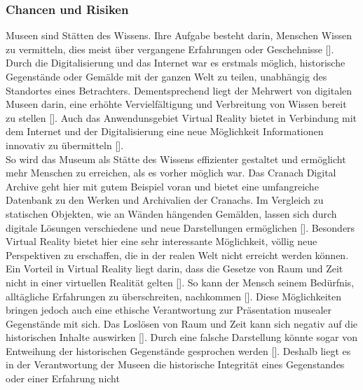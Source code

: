 \documentclass[a4paper,12pt,oneside]{article}
\begin{document}
      \subsubsection{Chancen und Risiken}
        Museen sind Stätten des Wissens. Ihre Aufgabe besteht darin, Menschen Wissen zu
        vermitteln, dies meist über vergangene Erfahrungen oder Geschehnisse [\cite[24]{fischer2001}].
        Durch die Digitalisierung und das Internet war es erstmals möglich, historische Gegenstände
        oder Gemälde mit der ganzen Welt zu teilen, unabhängig des Standortes eines
        Betrachters. Dementsprechend liegt der Mehrwert von digitalen Museen darin, eine
        erhöhte Vervielfältigung und Verbreitung von Wissen bereit zu stellen [\cite[17]{Huennekens2002}].
        Auch das Anwendunsgebiet Virtual Reality bietet in Verbindung mit dem Internet und der Digitalisierung
        eine neue Möglichkeit Informationen innovativ zu übermitteln [\cite[52]{Heidsiek2019}]. \\
        So wird das Museum als Stätte des Wissens effizienter gestaltet und ermöglicht 
        mehr Menschen
        zu erreichen, als es vorher möglich war. Das Cranach Digital Archive geht hier mit
        gutem Beispiel voran und bietet eine umfangreiche Datenbank
        zu den Werken und Archivalien der Cranachs.
        Im Vergleich zu statischen Objekten, wie an Wänden hängenden Gemälden, lassen sich 
        durch digitale Lösungen verschiedene und neue Darstellungen ermöglichen [\cite[17]{Huennekens2002}].
        Besonders Virtual Reality bietet hier eine sehr interessante Möglichkeit, völlig neue
        Perspektiven zu erschaffen, die in der realen Welt nicht erreicht werden können. \\
        Ein Vorteil in Virtual Reality liegt darin, dass die Gesetze von Raum und Zeit nicht
        in einer virtuellen Realität gelten [\cite[140]{Huennekens2002}]. So kann der Mensch
        seinem Bedürfnis, alltägliche Erfahrungen zu überschreiten, nachkommen [\cite[140]{Huennekens2002}].
        Diese Möglichkeiten bringen jedoch auch eine ethische 
        Verantwortung zur Präsentation musealer Gegenstände mit sich.
        Das Loslösen von Raum und Zeit kann sich negativ auf die historischen Inhalte auswirken
        [\cite[141]{Huennekens2002}]. Durch eine falsche Darstellung könnte 
        sogar von Entweihung der historischen
        Gegenstände gesprochen werden [\cite[141]{Huennekens2002}]. Deshalb liegt es in der 
        Verantwortung der
        Museen die historische Integrität eines Gegenstandes oder einer Erfahrung nicht
\end{document}
